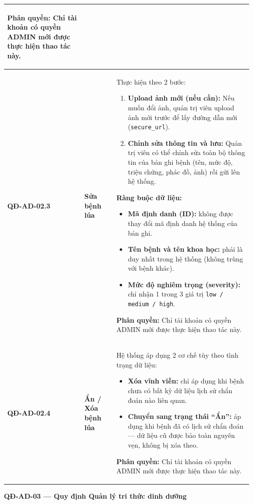 \documentclass[12pt,a4paper]{article}
\begin{document}
\begin{longtable}{|
        >{\raggedright\arraybackslash}p{2.2cm}|
        >{\raggedright\arraybackslash}p{2.8cm}|
        >{\raggedright\arraybackslash}p{9.8cm}|}
\begin{itemize}[leftmargin=*,topsep=2pt,itemsep=1pt]
    \end{itemize}
    \textbf{Phân quyền:} Chỉ tài khoản có quyền ADMIN mới được thực hiện thao tác này. \\
    \hline
    \textbf{QĐ-AD-02.3} & \textbf{Sửa bệnh lúa} &
    Thực hiện theo 2 bước:
    \begin{enumerate}[leftmargin=*,topsep=2pt,itemsep=1pt]
        \item \textbf{Upload ảnh mới (nếu cần):} Nếu muốn đổi ảnh, quản trị viên upload ảnh mới trước để lấy đường dẫn mới (\texttt{secure\_url}).
        \item \textbf{Chỉnh sửa thông tin và lưu:} Quản trị viên có thể chỉnh sửa toàn bộ thông tin của bản ghi bệnh (tên, mức độ, triệu chứng, phác đồ, ảnh) rồi gửi lên hệ thống.
    \end{enumerate}
    \textbf{Ràng buộc dữ liệu:}
    \begin{itemize}[leftmargin=*,topsep=2pt,itemsep=1pt]
        \item \textbf{Mã định danh (ID):} không được thay đổi mã định danh hệ thống của bản ghi.
        \item \textbf{Tên bệnh và tên khoa học:} phải là duy nhất trong hệ thống (không trùng với bệnh khác).
        \item \textbf{Mức độ nghiêm trọng (severity):} chỉ nhận 1 trong 3 giá trị \texttt{low / medium / high}.
    \end{itemize}
    \textbf{Phân quyền:} Chỉ tài khoản có quyền ADMIN mới được thực hiện thao tác này. \\
    \hline
    \textbf{QĐ-AD-02.4} & \textbf{Ẩn / Xóa bệnh lúa} &
    Hệ thống áp dụng 2 cơ chế tùy theo tình trạng dữ liệu:
    \begin{itemize}[leftmargin=*,topsep=2pt,itemsep=1pt]
        \item \textbf{Xóa vĩnh viễn:} chỉ áp dụng khi bệnh chưa có bất kỳ dữ liệu lịch sử chẩn đoán nào liên quan.
        \item \textbf{Chuyển sang trạng thái ``Ẩn'':} áp dụng khi bệnh đã có lịch sử chẩn đoán --- dữ liệu cũ được bảo toàn nguyên vẹn, không bị xóa theo.
    \end{itemize}
    \textbf{Phân quyền:} Chỉ tài khoản có quyền ADMIN mới được thực hiện thao tác này. \\
    \hline
\end{longtable}

\vspace{0.3cm}
\noindent\textbf{QĐ-AD-03 --- Quy định Quản lý tri thức dinh dưỡng}
\end{document}
